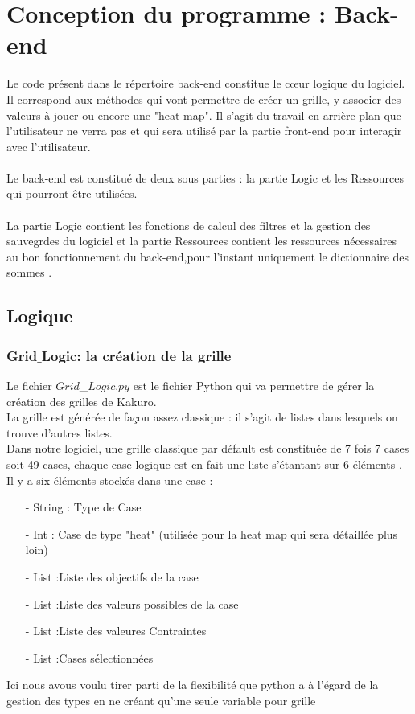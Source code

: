 \documentclass[french,12pt]{article}
\begin{document}
\section{Conception du programme : Back-end}
Le code présent dans le répertoire back-end constitue le cœur logique du logiciel. Il correspond aux méthodes qui vont permettre de créer un grille, y associer des valeurs à jouer ou  encore une "heat map". Il s'agit du travail en arrière plan que l'utilisateur ne verra pas et qui sera utilisé par la partie front-end pour interagir avec l'utilisateur.
\\ \\ 
Le back-end est constitué de deux sous parties : la partie Logic et les Ressources qui pourront être utilisées. \\ \\
La partie Logic contient les fonctions de calcul des filtres et la gestion des sauvegrdes du logiciel et la partie Ressources contient les ressources nécessaires au bon fonctionnement du back-end,pour l'instant uniquement le  dictionnaire des sommes .

 
\subsection{Logique}
\subsubsection{Grid$\_$Logic: la création de la grille}
Le fichier $Grid$\_$Logic.py$ est le fichier Python qui va permettre de gérer la création des grilles de Kakuro. \\ La grille est générée de façon assez classique : il s'agit de listes dans lesquels on trouve d'autres listes. \\
Dans notre logiciel, une grille classique par défault est constituée de 7 fois 7 cases soit 49 cases, chaque case logique est en fait une liste s'étantant sur 6 éléments . \\

\newpage
Il y a six éléments stockés dans une case : \\
\begin{enumerate}
\item[-] String : Type de Case
\item[-] Int : Case de type "heat" (utilisée pour la heat map qui sera détaillée plus loin)
\item[-] List :Liste des objectifs de la case
\item[-] List :Liste des valeurs possibles de la case
\item[-] List :Liste des valeures Contraintes
\item[-] List :Cases sélectionnées
\end{enumerate}
Ici nous avous voulu tirer parti de la flexibilité que python a à l'égard de la gestion des types en ne créant qu'une seule variable pour grille
\end{document}
